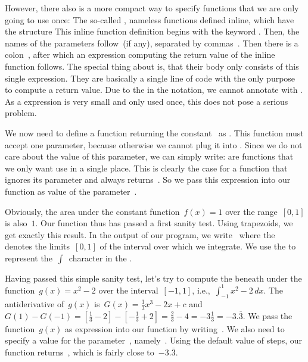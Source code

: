 However, there also is a more compact way to specify functions that we are only going to use once:
The so-called , nameless functions defined inline, which have the structure%
%
%
%
This inline function definition begins with the keyword .
Then, the names of the parameters follow~(if any), separated by commas~\pythonil{,}.
Then there is a colon~\pythonil{:}, after which an expression computing the return value of the inline function follows.
The special thing about  is, that their body only consists of this single expression.
They are basically a single line of code with the only purpose to compute a return value.
Due to the \pythonilIdx{:} in the notation, we cannot annotate  with .
As a  expression is very small and only used once, this does not pose a serious problem.

We now need to define a function returning the constant~ as .
This function must accept one parameter, because otherwise we cannot plug it into .
Since we do not care about the value of this parameter, we can simply write:%
%
%
%
 are functions that we only want use in a single place.
This is clearly the case for a function that ignores its parameter and always returns~.
So we pass this expression into our  function as value of the parameter~.

Obviously, the area under the constant function~$f(x)=1$ over the range~$[0,1]$ is also~$1$.
Our function  thus has passed a first sanity test.
Using  trapezoids, we get exactly this result.
In the output of our program, we write~ where the~ denotes the limits~$[0,1]$ of the interval over which we integrate.
We use the    to represent the~$\int$~character in the .

Having passed this simple sanity test, let's try to compute the beneath under the function~$g(x)=x^2-2$ over the interval~$[-1,1]$, i.e.,~$\int_{-1}^1 x^2-2\,dx$.
The antiderivative of~$g(x)$ is~$G(x)=\frac{1}{3}x^3-2x+c$ and $G(1)-G(-1)=[\frac{1}{3}-2]-[-\frac{1}{3}+2]=\frac{2}{3}-4=-3\frac{1}{3}=-3.\overline{3}$.
We pass the function~$g(x)$ as  expression into our  function by writing~.
We also need to specify a value for the parameter~, namely~.
Using the default value of  steps, our function returns~, which is fairly close to~$-3.\overline{3}$.


